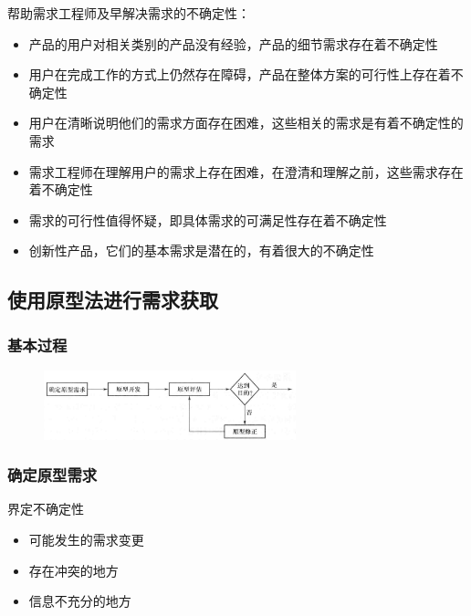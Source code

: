 帮助需求工程师及早解决需求的不确定性：
\begin{itemize}
    \item 产品的用户对相关类别的产品没有经验，产品的细节需求存在着不确定性
    \item 用户在完成工作的方式上仍然存在障碍，产品在整体方案的可行性上存在着不确定性
    \item 用户在清晰说明他们的需求方面存在困难，这些相关的需求是有着不确定性的需求
    \item 需求工程师在理解用户的需求上存在困难，在澄清和理解之前，这些需求存在着不确定性
    \item 需求的可行性值得怀疑，即具体需求的可满足性存在着不确定性
    \item 创新性产品，它们的基本需求是潜在的，有着很大的不确定性
\end{itemize}


\subsection{使用原型法进行需求获取}

\subsubsection{基本过程}

\begin{figure}[H]
	\centering
    \vspace{-1em}
	\includegraphics[width=0.65\textwidth]{img/使用原型方法获取需求的典型过程.png}
    \vspace{-1em}
\end{figure}

\subsubsection{确定原型需求}
界定不确定性
\vspace{-0.8em}
\begin{multicols}{3}
    \begin{itemize}
        \item 可能发生的需求变更
        \item 存在冲突的地方
        \item 信息不充分的地方
    \end{itemize}
\end{multicols}
\vspace{-1em}

